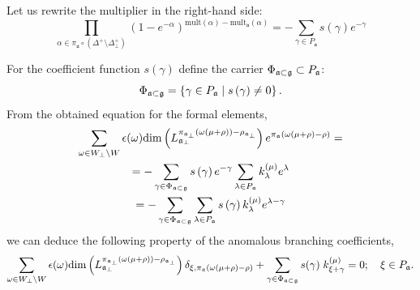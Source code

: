 \documentclass[a4paper,12pt]{article}
\theoremstyle{definition} \newtheorem{Def}{Definition}
\begin{document}
Let us rewrite the multiplier in the right-hand side:
\begin{equation}
  \label{eq:11}
    \prod_{\alpha\in \pi_{\mathfrak{a}}\circ (\Delta^{+}\setminus \Delta^{+}_{\bot})} \left(1-e^{-\alpha}\right)^{\mathrm{mult}(\alpha)-\mathrm{mult}_{\mathfrak{a}}(\alpha)}=
     -\sum_{\gamma\in P_{\mathfrak{a}}} s(\gamma)e^{-\gamma}
\end{equation}

For the coefficient function $s\left( \gamma \right) $ define the carrier $\Phi _{\frak{a%
}\subset \frak{g}}\subset P_{\frak{a}}$:
\begin{equation}
\Phi _{\frak{a}\subset \frak{g}}=\left\{ \gamma \in P_{\frak{a}}\mid s\left(
\gamma \right) \neq 0\right\} .  \label{phi-d}
\end{equation}
From the obtained equation for the formal elements,
\begin{multline}
  \label{eq:16}
  \sum_{\omega\in W_{\bot}\backslash W} \epsilon(\omega) \mathrm{dim}\left(L^{\pi_{\mathfrak{a}_{\bot}}(\omega(\mu+\rho))-\rho_{\mathfrak{a}_{\bot}}}_{\mathfrak{a}_{\bot}}\right) e^{\pi_{\mathfrak{a}}(\omega(\mu+\rho)-\rho)}=\\
  = -\sum_{\gamma \in \Phi _{\frak{a}\subset \frak{g}}} s\left( \gamma \right) e^{-\gamma }\sum_{\lambda \in P_{\frak{a}}}
  k_{\lambda }^{\left( \mu \right) }e^{\lambda } \\
  =-\sum_{\gamma \in \Phi _{\frak{a}\subset \frak{g}}}\sum_{\lambda \in P_{\frak{a}}}s\left( \gamma \right) k_{\lambda }^{\left( \mu \right)}e^{\lambda -\gamma }
\end{multline}
we can deduce the following property of the anomalous branching coefficients,
\begin{equation}
  \label{eq:17}
   \sum_{\omega\in W_{\bot}\backslash W} \epsilon(\omega) \mathrm{dim}\left(L^{\pi_{\mathfrak{a}_{\bot}}(\omega(\mu+\rho))-\rho_{\mathfrak{a}_{\bot}}}_{\mathfrak{a}_{\bot}}\right) \delta_{\xi,\pi_{\mathfrak{a}}(\omega(\mu+\rho)-\rho)}+
   \sum_{\gamma \in \Phi _{\frak{a}\subset \frak{g}}} s(\gamma)\; k^{(\mu)}_{\xi+\gamma}=0;\quad \xi\in P_{\mathfrak{a}}.
\end{equation}
\end{document}
